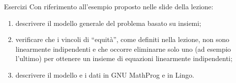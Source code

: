 \documentclass{beamer}
\begin{document}
\generatitolo


\begin{frame}{Esercizi}
Con riferimento all'esempio proposto nelle slide della lezione:
\begin{enumerate}
 \item descrivere il modello generale del problema basato su insiemi;
 \item verificare che i vincoli di ``equit\`a'', come definiti nella lezione,
	non sono linearmente indipendenti e che occorre eliminarne solo uno (ad esempio l'ultimo)
	per ottenere un insieme di equazioni linearmente indipendenti;
 \item descrivere il modello e i dati in GNU MathProg e in Lingo.
\end{enumerate}
\end{frame}
\end{document}
